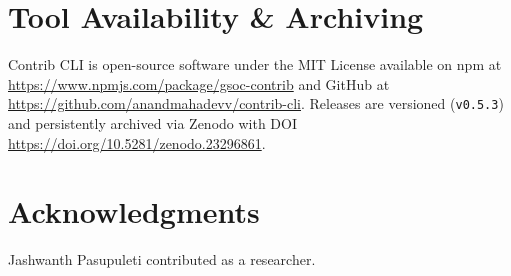 \documentclass[10pt,conference]{IEEEtran}
\begin{document}
\section{Tool Availability \& Archiving}
Contrib CLI is open-source software under the MIT License available on npm at \url{https://www.npmjs.com/package/gsoc-contrib} and GitHub at \url{https://github.com/anandmahadevv/contrib-cli}. Releases are versioned (\texttt{v0.5.3}) and persistently archived via Zenodo with DOI \url{https://doi.org/10.5281/zenodo.23296861}.

\section*{Acknowledgments}
Jashwanth Pasupuleti contributed as a researcher.
\end{document}
